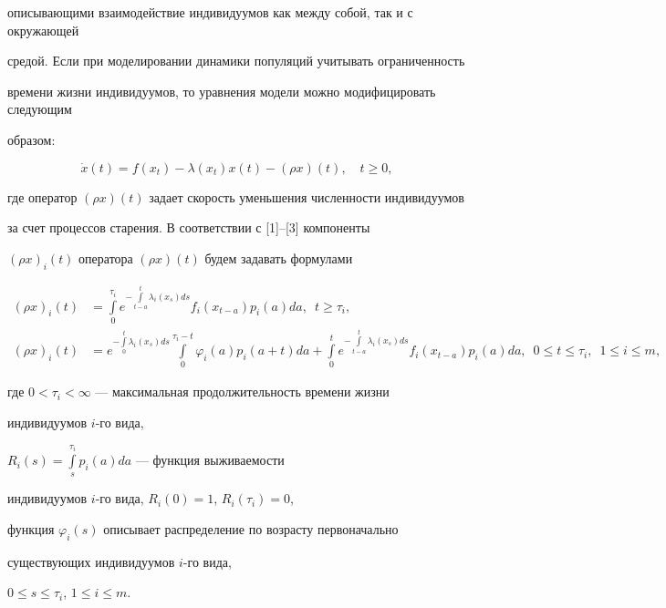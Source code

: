 описывающими взаимодействие индивидуумов как между собой, так и с окружающей


средой. Если при моделировании динамики популяций учитывать ограниченность


времени жизни индивидуумов, то уравнения модели можно модифицировать следующим


образом:


\begin{equation}


\Dot x(t) = f(x_t)-\lambda(x_t)x(t)-(\rho x)(t), \quad t \ge 0,


\end{equation}


где оператор $(\rho x)(t)$ задает скорость уменьшения численности индивидуумов


за счет процессов старения. В соответствии с [1]--[3] компоненты


$(\rho x)_i (t)$ оператора $(\rho x)(t)$ будем задавать формулами


\begin{align*}


(\rho x)_i (t) &= \int\limits_0^{\tau_i}e^{-\int\limits_{t-a}^{t}


\lambda_i (x_s)ds}f_i(x_{t-a})p_i(a)da, \ \; t \ge \tau_{i},\\


(\rho x)_i (t) &= e^{-\int\limits_0^t\lambda_i (x_s)ds}


\int\limits_0^{\tau_i-t}\varphi_i(a)p_i(a+t) da+


\int\limits_0^t e^{-\int\limits_{t-a}^t


\lambda_i (x_s)ds}f_i(x_{t-a})p_i(a)da, \ \;


0 \le t \le \tau_i, \ \; 1 \le i \le m,


\end{align*}


где $0<\tau_i <\infty$ --- максимальная продолжительность времени жизни


индивидуумов $i$-го вида,


$R_i(s)=\int\limits_s^{\tau_i}p_i(a)da$ --- функция выживаемости


индивидуумов $i$-го вида, $R_i(0)=1$, $R_i(\tau_i)=0$,


функция $\varphi_i(s)$ описывает распределение по возрасту первоначально


существующих индивидуумов $i$-го вида,


$0 \le s \le \tau_i$, $1 \le i \le m$.





